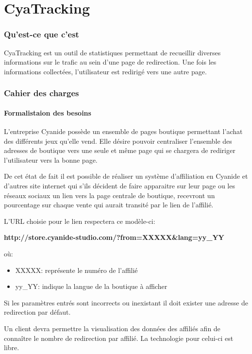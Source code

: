 \part*{CyaTracking}
\section*{Qu'est-ce que c'est}
CyaTracking est un outil de statistiques permettant de recueillir diverses informations sur le trafic au sein d'une page de redirection. Une fois les informations collectées, l'utilisateur est redirigé vers une autre page.

\section*{Cahier des charges}

\subsection*{Formalistaion des besoins}

L'entreprise Cyanide possède un ensemble de pages boutique permettant l'achat des différents jeux qu'elle vend.
Elle désire pouvoir centraliser l'ensemble des adresses de boutique vers une seule et même page qui se chargera de rediriger l'utilisateur vers la bonne page.

De cet état de fait il est possible de réaliser un système d'affiliation en Cyanide et d'autres site internet qui s'ils décident de faire apparaitre sur leur page ou les réseaux sociaux un lien vers la page centrale de boutique, recevront un pourcentage sur chaque vente qui aurait transité par le lien de l'affilié.

L'URL choisie pour le lien respectera ce modèle-ci:


\textbf{http://store.cyanide-studio.com/?from=XXXXX\&lang=yy\_YY }

où:
\begin{itemize}
\item XXXXX: représente le numéro de l'affilié 
\item yy\_YY: indique la langue de la boutique à afficher 
\end{itemize}

Si les paramètres entrés sont incorrects ou inexistant il doit exister une adresse de redirection par défaut.

Un client devra permettre la visualisation des données des affiliés afin de connaître le nombre de redirection par affilié. La technologie pour celui-ci est libre.

